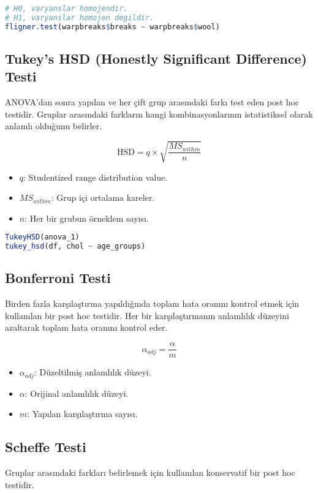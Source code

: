 \begin{lstlisting}[language=R]
# H0, varyanslar homojendir.
# H1, varyanslar homojen degildir.
fligner.test(warpbreaks$breaks ~ warpbreaks$wool)
\end{lstlisting}

\newpage

\subsection{Tukey's HSD (Honestly Significant Difference) Testi}
ANOVA'dan sonra yapılan ve her çift grup arasındaki farkı test eden post hoc testidir. Gruplar arasındaki farkların hangi kombinasyonlarının istatistiksel olarak anlamlı olduğunu belirler.

\[  \text{HSD} = q \times \sqrt{\frac{MS_{within}}{n}} \]

\begin{itemize}
	\item $q$: Studentized range distribution value.
	\item $MS_{within}$: Grup içi ortalama kareler.
	\item $n$: Her bir grubun örneklem sayısı.
\end{itemize}

\begin{lstlisting}[language=R]
TukeyHSD(anova_1)
tukey_hsd(df, chol ~ age_groups)
\end{lstlisting}

\newpage

\subsection{Bonferroni Testi}
Birden fazla karşılaştırma yapıldığında toplam hata oranını kontrol etmek için kullanılan bir post hoc testidir. Her bir karşılaştırmanın anlamlılık düzeyini azaltarak toplam hata oranını kontrol eder.

\[ \alpha_{adj} = \frac{\alpha}{m} \]

\begin{itemize}
	\item $\alpha_{adj}$: Düzeltilmiş anlamlılık düzeyi.
	\item $\alpha$: Orijinal anlamlılık düzeyi.
	\item $m$: Yapılan karşılaştırma sayısı.
\end{itemize}

\newpage

\subsection{Scheffe Testi}
Gruplar arasındaki farkları belirlemek için kullanılan konservatif bir post hoc testidir. 


